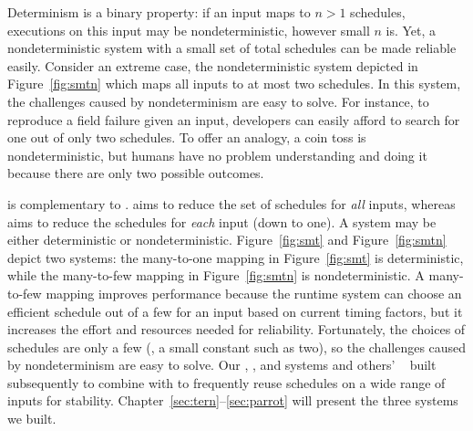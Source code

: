  Determinism
is a binary property: if an input maps to $n > 1$ schedules, executions on this
input may be nondeterministic, however small $n$ is.  Yet, a nondeterministic
system with a small set of total schedules can be made reliable easily. 
Consider an extreme case, the nondeterministic system depicted in
Figure~\ref{fig:smtn} which maps all inputs to at most two schedules.  In this
system, the challenges caused by nondeterminism are
easy to solve.  For instance, to reproduce a field failure given an input,
developers can easily afford to search for one out of only two schedules.
To offer an analogy, a coin toss is nondeterministic, but humans have
no problem understanding and doing it because there are only two possible
outcomes.

\dmt is complementary to \smt. \smt aims to reduce the set of schedules for
\emph{all} inputs, whereas \dmt aims to reduce the schedules for \emph{each}
input (down to one).  A \smt system may be either deterministic or
nondeterministic. Figure~\ref{fig:smt} and Figure~\ref{fig:smtn} depict two \smt
systems: the many-to-one mapping in Figure~\ref{fig:smt} is deterministic, while
the many-to-few mapping in Figure~\ref{fig:smtn} is nondeterministic.  A
many-to-few mapping improves performance because the runtime system can choose
an efficient schedule out of a few for an input based on current timing factors,
but it increases the effort and resources needed for reliability.  Fortunately,
the choices of schedules are only a few (\eg, a small constant such as two), so
the challenges caused by nondeterminism are easy to solve. Our \tern,
\peregrine, and \parrot systems and others' \dthreads~\cite{dthreads:sosp11}
built subsequently to \tern combine \dmt with \smt to frequently reuse schedules
on a wide range of inputs for stability.
Chapter~\ref{sec:tern}--\ref{sec:parrot} will present the three systems we
built.
